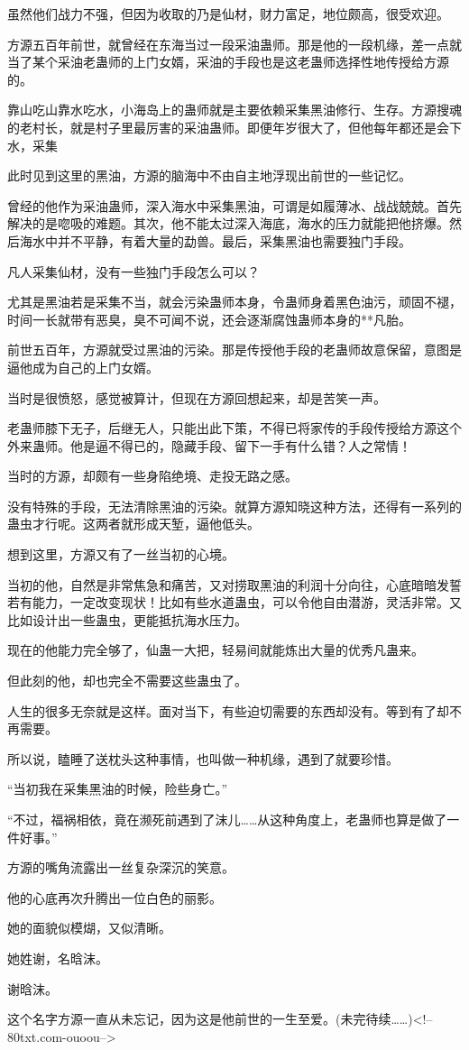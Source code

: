 \begin{this_body}
虽然他们战力不强，但因为收取的乃是仙材，财力富足，地位颇高，很受欢迎。

方源五百年前世，就曾经在东海当过一段采油蛊师。那是他的一段机缘，差一点就当了某个采油老蛊师的上门女婿，采油的手段也是这老蛊师选择性地传授给方源的。

靠山吃山靠水吃水，小海岛上的蛊师就是主要依赖采集黑油修行、生存。方源搜魂的老村长，就是村子里最厉害的采油蛊师。即便年岁很大了，但他每年都还是会下水，采集

此时见到这里的黑油，方源的脑海中不由自主地浮现出前世的一些记忆。

曾经的他作为采油蛊师，深入海水中采集黑油，可谓是如履薄冰、战战兢兢。首先解决的是唿吸的难题。其次，他不能太过深入海底，海水的压力就能把他挤爆。然后海水中并不平静，有着大量的勐兽。最后，采集黑油也需要独门手段。

凡人采集仙材，没有一些独门手段怎么可以？

尤其是黑油若是采集不当，就会污染蛊师本身，令蛊师身着黑色油污，顽固不褪，时间一长就带有恶臭，臭不可闻不说，还会逐渐腐蚀蛊师本身的**凡胎。

前世五百年，方源就受过黑油的污染。那是传授他手段的老蛊师故意保留，意图是逼他成为自己的上门女婿。

当时是很愤怒，感觉被算计，但现在方源回想起来，却是苦笑一声。

老蛊师膝下无子，后继无人，只能出此下策，不得已将家传的手段传授给方源这个外来蛊师。他是逼不得已的，隐藏手段、留下一手有什么错？人之常情！

当时的方源，却颇有一些身陷绝境、走投无路之感。

没有特殊的手段，无法清除黑油的污染。就算方源知晓这种方法，还得有一系列的蛊虫才行呢。这两者就形成天堑，逼他低头。

想到这里，方源又有了一丝当初的心境。

当初的他，自然是非常焦急和痛苦，又对捞取黑油的利润十分向往，心底暗暗发誓若有能力，一定改变现状！比如有些水道蛊虫，可以令他自由潜游，灵活非常。又比如设计出一些蛊虫，更能抵抗海水压力。

现在的他能力完全够了，仙蛊一大把，轻易间就能炼出大量的优秀凡蛊来。

但此刻的他，却也完全不需要这些蛊虫了。

人生的很多无奈就是这样。面对当下，有些迫切需要的东西却没有。等到有了却不再需要。

所以说，瞌睡了送枕头这种事情，也叫做一种机缘，遇到了就要珍惜。

“当初我在采集黑油的时候，险些身亡。”

“不过，福祸相依，竟在濒死前遇到了沫儿……从这种角度上，老蛊师也算是做了一件好事。”

方源的嘴角流露出一丝复杂深沉的笑意。

他的心底再次升腾出一位白色的丽影。

她的面貌似模煳，又似清晰。

她姓谢，名晗沫。

谢晗沫。

这个名字方源一直从未忘记，因为这是他前世的一生至爱。(未完待续……)<!--80txt.com-ouoou-->

\end{this_body}

